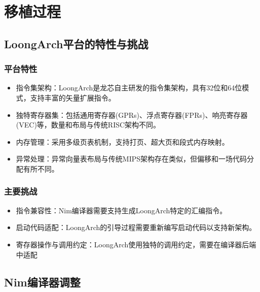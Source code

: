 \documentclass[UTF8]{ctexart}
\begin{document}
\section{移植过程} %
	\subsection{LoongArch平台的特性与挑战} %
		\subsubsection{平台特性} %
		\begin{itemize}[leftmargin=3.5em]
			\item 指令集架构：LoongArch是龙芯自主研发的指令集架构，具有32位和64位模式，支持丰富的矢量扩展指令。
			\item 独特寄存器集：包括通用寄存器(GPRs)、浮点寄存器(FPRs)、响亮寄存器(VEC)等，数量和布局与传统RISC架构不同。
			\item 内存管理：采用多级页表机制，支持打页、超大页和段式内存映射。
			\item 异常处理：异常向量表布局与传统MIPS架构存在类似，但偏移和一场代码分配有所不同。
		\end{itemize}
		\subsubsection{主要挑战} %
		\begin{itemize}[leftmargin=3.5em]
			\item 指令兼容性：Nim编译器需要支持生成LoongArch特定的汇编指令。
			\item 启动代码适配：LoongArch的引导过程需要重新编写启动代码以支持新架构。
			\item 寄存器操作与调用约定：LoongArch使用独特的调用约定，需要在编译器后端中适配
		\end{itemize}
	\subsection{Nim编译器调整} %
\end{document}
